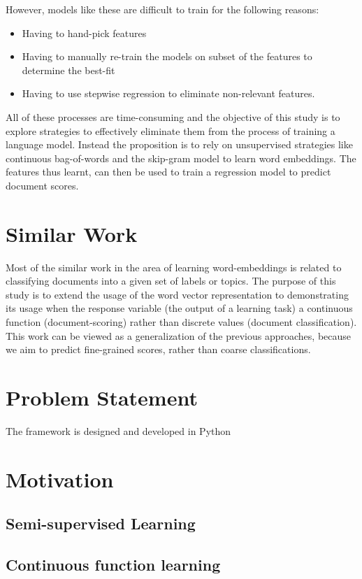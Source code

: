 \documentclass[conference]{IEEEtran}
\begin{document}
However, models like these are difficult to train for the following reasons:
\begin{itemize}
  \item Having to hand-pick features
  \item Having to manually re-train the models on subset of the features to determine the best-fit
  \item Having to use stepwise regression to eliminate non-relevant features.
\end{itemize}

All of these processes are time-consuming and the objective of this study is to explore strategies to effectively eliminate them from the process of training a language model. Instead the proposition is to rely on unsupervised strategies like continuous bag-of-words and the skip-gram model to learn word embeddings. The features thus learnt, can then be used to train a regression model to predict document scores.


\section{Similar Work}
Most of the similar work in the area of learning word-embeddings is related to classifying documents into a given set of labels or topics. The purpose of this study is to extend the usage of the word vector representation to demonstrating its usage when the response variable (the output of a learning task) a continuous function (document-scoring) rather than discrete values (document classification). This work can be viewed as a generalization of the previous approaches, because we aim to predict fine-grained scores, rather than coarse classifications.


\section{Problem Statement}
The framework is designed and developed in Python


\section{Motivation}

\subsection{Semi-supervised Learning}

\subsection{Continuous function learning}
\end{document}
